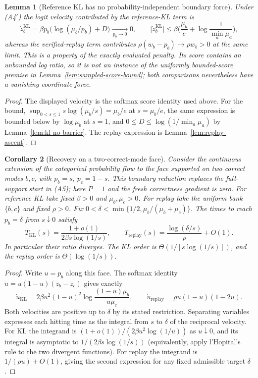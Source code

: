 \documentclass{article}
\newcommand{\enforcehalffinalproseline}{%
  \setlength{\parfillskip}{0pt plus .20\linewidth}}
\newcommand{\1}{\mathbf 1}
\newtheorem{lemma}{Lemma}[section]
\newtheorem{corollary}[lemma]{Corollary}
\theoremstyle{remark}
\theoremstyle{definition}
\theoremstyle{plain}
\begin{document}
\begin{lemma}[Reference KL has no probability-independent boundary force]
\enforcehalffinalproseline
\label{lem:kl-boundary-force}
Under (A4$'$) the logit velocity contributed by the reference-KL term is
\[
  \dot z^{\mathrm{KL}}_b=\beta p_b\big(\log(\mu_b/p_b)+D\big)
  \xrightarrow[\,p_b\to0\,]{}0,
  \qquad
  \big|\dot z^{\mathrm{KL}}_b\big|
  \le\beta\Big(\frac{\mu_b}{e}+\log\frac1{\min_a\mu_a}\Big),
\]
whereas the verified-replay term contributes $\rho(w_b-p_b)\to\rho w_b>0$ at
the same limit. This is a property of the exactly evaluated penalty. Its score contains
an unbounded log ratio, so it is not an instance of the uniformly
bounded-score premise in Lemma~\ref{lem:sampled-score-bound}; both
comparisons nevertheless have a vanishing coordinate force.
\end{lemma}

\begin{proof}
\enforcehalffinalproseline
The displayed velocity is the softmax score identity used above. For the
bound, $\sup_{0<s\le1}s\log(\mu_b/s)=\mu_b/e$ at $s=\mu_b/e$, the same
expression is bounded below by $\log\mu_b$ at $s=1$, and $0\le D\le
\log(1/\min_a\mu_a)$ by Lemma~\ref{lem:kl-no-barrier}. The replay expression is
Lemma~\ref{lem:replay-ascent}.
\end{proof}

\begin{corollary}[Recovery on a two-correct-mode face]
\enforcehalffinalproseline
\label{cor:kl-recovery-time}
Consider the continuous extension of the categorical probability flow to
the face supported on two correct modes $b,c$, with $p_b=s$, $p_c=1-s$.
This boundary reduction replaces the full-support start in (A5); here $P=1$
and the fresh correctness gradient is zero. For reference KL take fixed
$\beta>0$ and $\mu_b,\mu_c>0$. For replay take the uniform bank $\{b,c\}$
and fixed $\rho>0$. Fix
$0<\delta<\min\{1/2,\mu_b/(\mu_b+\mu_c)\}$.
The times to reach $p_b=\delta$ from $s\downarrow0$ satisfy
\[
 T_{\mathrm{KL}}(s)
 =\frac{1+o(1)}{2\beta s\log(1/s)},\qquad
 T_{\mathrm{replay}}(s)
 =\frac{\log(\delta/s)}{\rho}+O(1).
\]
In particular their ratio diverges. The KL order is
$\Theta(1/[s\log(1/s)])$, and the replay order is
$\Theta(\log(1/s))$.
\end{corollary}
\begin{proof}
\enforcehalffinalproseline
Write $u=p_b$ along this face. The softmax identity
$\dot u=u(1-u)(\dot z_b-\dot z_c)$ gives exactly
\[
 \dot u_{\mathrm{KL}}
 =2\beta u^2(1-u)^2\log\frac{(1-u)\mu_b}{u\mu_c},
 \qquad
 \dot u_{\mathrm{replay}}
 =\rho u(1-u)(1-2u).
\]
Both velocities are positive up to $\delta$ by its stated restriction.
Separating variables expresses each hitting time as the integral from
$s$ to $\delta$ of the reciprocal velocity. For KL the integrand is
$(1+o(1))/(2\beta u^2\log(1/u))$ as $u\downarrow0$, and its integral is
asymptotic to $1/(2\beta s\log(1/s))$ (equivalently, apply
l'Hopital's rule to the two divergent functions). For replay the integrand
is $1/(\rho u)+O(1)$, giving the second expression for any fixed admissible target $\delta$.
\end{proof}
\end{document}

